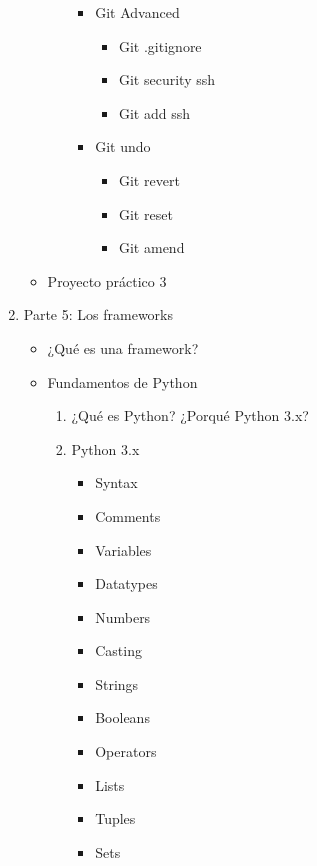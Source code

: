 \documentclass[12pt, letterpaper]{article}
\begin{document}
\begin{enumerate}
\begin{itemize}
\begin{enumerate}
\begin{itemize}
\begin{itemize}
                \end{itemize}
                \item Git Advanced
                \begin{itemize}
                    \item Git .gitignore
                    \item Git security ssh
                    \item Git add ssh
                \end{itemize}
                \item Git undo
                \begin{itemize}
                    \item Git revert
                    \item Git reset
                    \item Git amend
                \end{itemize}
            \end{itemize}
        \end{enumerate}
        \item Proyecto práctico 3
    \end{itemize}
    \item Parte 5: Los frameworks
    \begin{itemize}
        \item ¿Qué es una framework?
        \item Fundamentos de Python
        \begin{enumerate}
            \item ¿Qué es Python? ¿Porqué Python 3.x?
            \item Python 3.x
            \begin{itemize}
                \item Syntax
                \item Comments
                \item Variables
                \item Datatypes
                \item Numbers
                \item Casting
                \item Strings
                \item Booleans
                \item Operators
                \item Lists
                \item Tuples
                \item Sets

\end{itemize}
\end{enumerate}
\end{itemize}
\end{enumerate}
\end{document}
